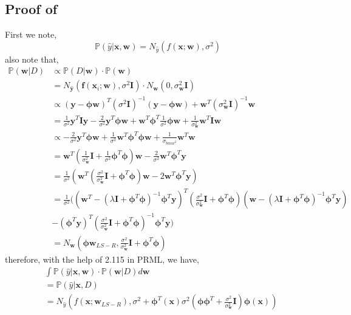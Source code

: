 \begin{appendices}
\subsection{Proof of } \label{proof:complicated-integral}
First we note,
\begin{equation}
    \mathbb{P}(\hat{y}| \bm{x}, \bm{w}) = N_{\hat{y}}(f(\bm{x};\bm{w}), \sigma^{2})
\end{equation}
also note that,
\begin{align}
    \mathbb{P}(\bm{w}|D) &{} \propto \mathbb{P}(D| \bm{w}) \cdot \mathbb{P}(\bm{w}) \\
    & = N_{\hat{\bm{y}}}(\bm{f}(\bm{x}_{i} ;\bm{w}), \sigma^{2} \bm{I}) \cdot N_{\bm{w}}(0,\sigma_{\bm{w}}^{2} \bm{I}) \\
    & \propto (\bm{y} - \bm{\phi w})^{T} (\sigma^{2} \bm{I})^{-1} (\bm{y} - \bm{\phi w}) + \bm{w}^{T} (\sigma_{\bm{w}}^{2} \bm{I})^{-1} \bm{w} \\
    & = \frac{1}{\sigma^{2}} \bm{y}^{T} \bm{Iy} -\frac{2}{\sigma^{2}} \bm{y}^{T} \bm{\phi w} + \bm{w}^{T} \bm{\phi}^{T} \frac{1}{\sigma^{2}} \bm{\phi w} + \frac{1}{\sigma_{\bm{w}}^{2}} \bm{w}^{T} \bm{Iw} \\
    & \propto - \frac{2}{\sigma^{2}} \bm{y}^{T} \bm{\phi w} + \frac{1}{\sigma^{2}} \bm{w}^{T} \bm{\phi}^{T} \bm{\phi w} + \frac{1}{\sigma_{bm{w}^{2}}} \bm{w}^{T} \bm{w} \\
    & = \bm{w}^{T} (\frac{1}{\sigma_{\bm{w}}^{2}} \bm{I} + \frac{1}{\sigma^{2}} \bm{\phi}^{T} \bm{\phi}) \bm{w} - \frac{2}{\sigma^{2}} \bm{w}^{T} \bm{\phi}^{T} \bm{y}  \\
    & = \frac{1}{\sigma^{2}} (\bm{w}^{T} (\frac{\sigma^{2}}{\sigma_{\bm{w}}^{2}} \bm{I} + \bm{\phi}^{T} \bm{\phi}) \bm{w} -2 \bm{w}^{T} \bm{\phi}^{T} \bm{y}) \\
    & = \frac{1}{\sigma^{2}} ( (\bm{w}^{T} - (\lambda\bm{I} + \bm{\phi}^{T} \bm{\phi})^{-1} \bm{\phi}^{T} \bm{y})^{T}  (\frac{\sigma^{2}}{\sigma_{\bm{w}}^{2}} \bm{I} + \bm{\phi}^{T} \bm{\phi})  (\bm{w} - (\lambda \bm{I} + \bm{\phi}^{T} \bm{\phi})^{-1} \bm{\phi}^{T} \bm{y}) \\ & - (\bm{\phi}^{T} \bm{y})^{T} (\frac{\sigma^{2}}{\sigma_{\bm{w}}^{2}} \bm{I} + \bm{\phi}^{T} \bm{\phi})^{-1} \bm{\phi}^{T} \bm{y}  ) \\
    & = N_{\bm{w}} (\bm{\phi} \bm{w}_{LS-R}, \frac{\sigma^{2}}{\sigma_{\bm{w}}^{2}} \bm{I} + \bm{\phi}^{T} \bm{\phi})
\end{align}   
therefore, with the help of 2.115 in PRML, we have,
\begin{align}
    &{} \int \mathbb{P} (\hat{y}|\bm{x},\bm{w}) \cdot \mathbb{P}(\bm{w}|D) d \bm{w} \\
    & = \mathbb{P}(\hat{y}| \bm{x}, D) \\
    & = N_{\hat{y}}(f(\bm{x};\bm{w}_{LS-R}), \sigma^{2} + \bm{\phi}^{T}(\bm{x}) \sigma^{2} (\bm{\phi} \bm{\phi}^{T} + \frac{\sigma^{2}}{\sigma_{\bm{w}}^{2}} \bm{I}) \bm{\phi}(\bm{x}))
\end{align}


\end{appendices}
